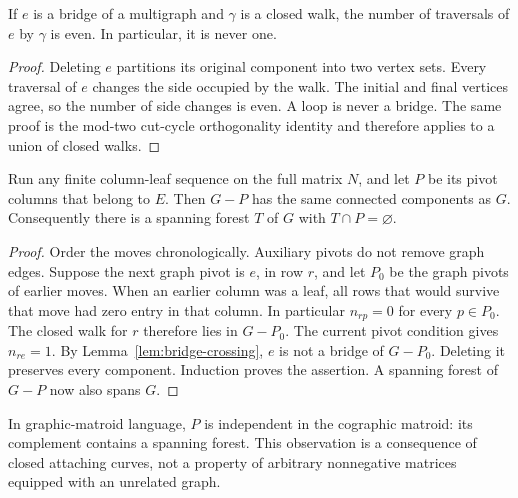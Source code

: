 \begin{lemma}
\label{lem:bridge-crossing}
If $e$ is a bridge of a multigraph and $\gamma$ is a closed walk, the number
of traversals of $e$ by $\gamma$ is even.  In particular, it is never one.
\end{lemma}
\begin{proof}
Deleting $e$ partitions its original component into two vertex sets.  Every
traversal of $e$ changes the side occupied by the walk.  The initial and
final vertices agree, so the number of side changes is even.  A loop is
never a bridge.  The same proof is the mod-two cut-cycle orthogonality
identity and therefore applies to a union of closed walks.
\end{proof}

\begin{theorem}
\label{thm:deferred-connectivity}
Run any finite column-leaf sequence on the full matrix $N$, and let $P$
be its pivot columns that belong to $E$.  Then $G-P$ has the same connected
components as $G$.  Consequently there is a spanning forest $T$ of $G$
with $T\cap P=\varnothing$.
\end{theorem}
\begin{proof}
Order the moves chronologically.  Auxiliary pivots do not remove graph
edges.  Suppose the next graph pivot is $e$, in row $r$, and let $P_0$ be
the graph pivots of earlier moves.  When an earlier column was a leaf, all
rows that would survive that move had zero entry in that column.  In
particular $n_{rp}=0$ for every $p\in P_0$.  The closed walk for $r$
therefore lies in $G-P_0$.  The current pivot condition gives $n_{re}=1$.
By Lemma~\ref{lem:bridge-crossing}, $e$ is not a bridge of $G-P_0$.
Deleting it preserves every component.  Induction proves the assertion.
A spanning forest of $G-P$ now also spans $G$.
\end{proof}

In graphic-matroid language, $P$ is independent in the cographic matroid:
its complement contains a spanning forest.  This observation is a
consequence of closed attaching curves, not a property of arbitrary
nonnegative matrices equipped with an unrelated graph.

